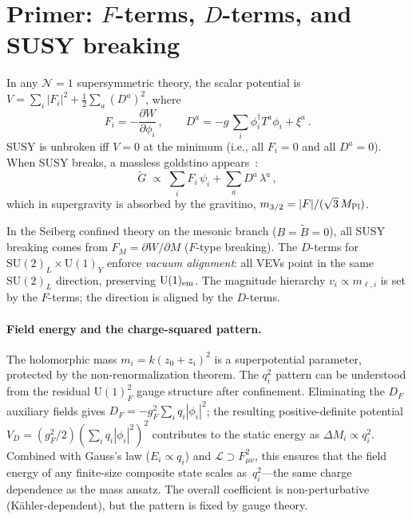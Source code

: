 \documentclass[12pt,a4paper]{article}
\makeatletter
\newcommand{\SU}{\mathrm{SU}}
\newcommand{\UU}{\mathrm{U}}
\newcommand{\ie}{i.e.\@}
\makeatother
\begin{document}
\section{Primer: $F$-terms, $D$-terms, and SUSY breaking}
\label{app:primer}

In any $\mathcal{N}=1$ supersymmetric theory, the scalar potential
is $V = \sum_i |F_i|^2 + \frac{1}{2}\sum_a (D^a)^2$, where
\begin{equation}
  F_i = -\frac{\partial W}{\partial\phi_i}\,,
  \qquad
  D^a = -g\,\sum_i \phi_i^\dagger T^a \phi_i + \xi^a\,.
  \label{eq:Fterm_def}
\end{equation}
\label{eq:Dterm_def}%
\label{eq:Vscalar}%
SUSY is unbroken iff $V = 0$ at the minimum (\ie, all $F_i = 0$
and all $D^a = 0$).  When SUSY breaks, a massless goldstino
appears~\cite{VolkovAkulov:1973}:
\begin{equation}
  \tilde G \;\propto\; \sum_i F_i\,\psi_i
    + \sum_a D^a\,\lambda^a\,,
  \label{eq:goldstino}
\end{equation}
which in supergravity is absorbed by the gravitino,
$m_{3/2} = |F|/(\sqrt{3}\,M_{\rm Pl})$.

In the Seiberg confined theory on the mesonic branch
($B = \tilde B = 0$), all SUSY breaking comes from
$F_M = \partial W/\partial M$ ($F$-type breaking).
The $D$-terms for $\SU(2)_L \times \UU(1)_Y$ enforce
\emph{vacuum alignment}: all VEVs point in the same $\SU(2)_L$
direction, preserving $\UU(1)_{\rm em}$. The magnitude hierarchy
$v_i \propto m_{\ell,i}$ is set by the $F$-terms; the direction
is aligned by the $D$-terms.

\paragraph{Field energy and the charge-squared pattern.}
The holomorphic mass $m_i = k(z_0{+}z_i)^2$ is a superpotential
parameter, protected by the non-renormalization theorem.
The $q_i^2$ pattern can be understood from the residual
$\UU(1)^2_F$ gauge structure after confinement.  Eliminating the
$D_F$ auxiliary fields gives $D_F = -g_F^2\sum_i q_i|\phi_i|^2$;
the resulting positive-definite potential $V_D = (g_F^2/2)
(\sum_i q_i|\phi_i|^2)^2$ contributes to the static energy as
$\Delta M_i \propto q_i^2$.  Combined with Gauss's law ($E_i \propto
q_i$) and $\mathcal{L} \supset F_{\mu\nu}^2$, this ensures that
the field energy of any finite-size composite state scales
as~$q_i^2$---the same charge dependence as the mass ansatz.
The overall coefficient is non-perturbative (K\"ahler-dependent),
but the pattern is fixed by gauge theory.
\end{document}
